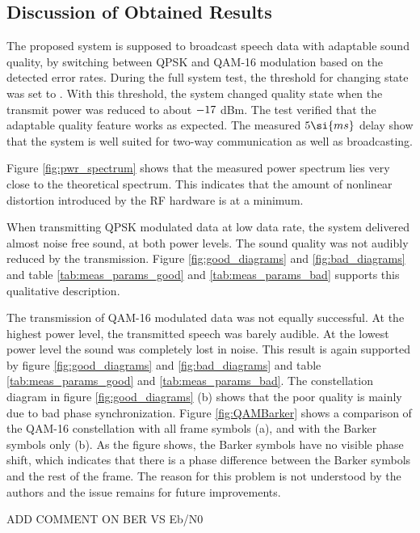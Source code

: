 \subsection{Discussion of Obtained Results}
The proposed system is supposed to broadcast speech data with adaptable sound quality, by switching between QPSK and QAM-16 modulation based on the detected error rates. During the full system test, the threshold for changing state was set to \BERThreshold. With this threshold, the system changed quality state when the transmit power was reduced to about $-17$ dBm. The test verified that the adaptable quality feature works as expected. The measured $\measDelay \si{ms}$ delay show that the system is well suited for two-way communication as well as broadcasting. 

Figure \ref{fig:pwr_spectrum} shows that the measured power spectrum lies very close to the theoretical spectrum. This indicates that the amount of nonlinear distortion introduced by the RF hardware is at a minimum.

When transmitting QPSK modulated data at low data rate, the system delivered almost noise free sound, at both power levels. The sound quality was not audibly reduced by the transmission. Figure \ref{fig:good_diagrams} and \ref{fig:bad_diagrams} and table \ref{tab:meas_params_good} and \ref{tab:meas_params_bad} supports this qualitative description. 

The transmission of QAM-16 modulated data was not equally successful. At the highest power level, the transmitted speech was barely audible. At the lowest power level the sound was completely lost in noise. This result is again supported by figure \ref{fig:good_diagrams} and \ref{fig:bad_diagrams} and table \ref{tab:meas_params_good} and \ref{tab:meas_params_bad}. The constellation diagram in figure \ref{fig:good_diagrams} (b) shows that the poor quality is mainly due to bad phase synchronization. Figure \ref{fig:QAMBarker} shows a comparison of the QAM-16 constellation with all frame symbols (a), and with the Barker symbols only (b). As the figure shows, the Barker symbols have no visible phase shift, which indicates that there is a phase difference between the Barker symbols and the rest of the frame. The reason for this problem is not understood by the authors and the issue remains for future improvements.

ADD COMMENT ON BER VS Eb/N0
